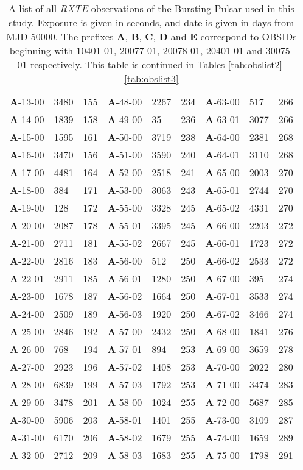 \begin{table*}
\begin{tabular}{lllllllll}
\textbf{A}-13-00&3480&155&\textbf{A}-48-00&2267&234&\textbf{A}-63-00&517&266\\
\textbf{A}-14-00&1839&158&\textbf{A}-49-00&35&236&\textbf{A}-63-01&3077&266\\
\textbf{A}-15-00&1595&161&\textbf{A}-50-00&3719&238&\textbf{A}-64-00&2381&268\\
\textbf{A}-16-00&3470&156&\textbf{A}-51-00&3590&240&\textbf{A}-64-01&3110&268\\
\textbf{A}-17-00&4481&164&\textbf{A}-52-00&2518&241&\textbf{A}-65-00&2003&270\\
\textbf{A}-18-00&384&171&\textbf{A}-53-00&3063&243&\textbf{A}-65-01&2744&270\\
\textbf{A}-19-00&128&172&\textbf{A}-55-00&3328&245&\textbf{A}-65-02&4331&270\\
\textbf{A}-20-00&2087&178&\textbf{A}-55-01&3395&245&\textbf{A}-66-00&2203&272\\
\textbf{A}-21-00&2711&181&\textbf{A}-55-02&2667&245&\textbf{A}-66-01&1723&272\\
\textbf{A}-22-00&2816&183&\textbf{A}-56-00&512&250&\textbf{A}-66-02&2533&272\\
\textbf{A}-22-01&2911&185&\textbf{A}-56-01&1280&250&\textbf{A}-67-00&395&274\\
\textbf{A}-23-00&1678&187&\textbf{A}-56-02&1664&250&\textbf{A}-67-01&3533&274\\
\textbf{A}-24-00&2509&189&\textbf{A}-56-03&1920&250&\textbf{A}-67-02&3466&274\\
\textbf{A}-25-00&2846&192&\textbf{A}-57-00&2432&250&\textbf{A}-68-00&1841&276\\
\textbf{A}-26-00&768&194&\textbf{A}-57-01&894&253&\textbf{A}-69-00&3659&278\\
\textbf{A}-27-00&2923&196&\textbf{A}-57-02&1408&253&\textbf{A}-70-00&2022&280\\
\textbf{A}-28-00&6839&199&\textbf{A}-57-03&1792&253&\textbf{A}-71-00&3474&283\\
\textbf{A}-29-00&3478&201&\textbf{A}-58-00&1024&255&\textbf{A}-72-00&5687&285\\
\textbf{A}-30-00&5906&203&\textbf{A}-58-01&1401&255&\textbf{A}-73-00&3109&287\\
\textbf{A}-31-00&6170&206&\textbf{A}-58-02&1679&255&\textbf{A}-74-00&1659&289\\
\textbf{A}-32-00&2712&209&\textbf{A}-58-03&1683&255&\textbf{A}-75-00&1798&291\\
\hline
\hline
\end{tabular}
\caption[A list of all \textit{RXTE} observations of the Bursting Pulsar used in this thesis.]{A list of all \indexrxte\textit{RXTE} observations of the Bursting Pulsar used in this study.  Exposure is given in seconds, and date is given in days from MJD 50000.  The prefixes \textbf{A}, \textbf{B}, \textbf{C}, \textbf{D} and \textbf{E} correspond to OBSIDs beginning with 10401-01, 20077-01, 20078-01, 20401-01 and 30075-01 respectively.  This table is continued in Tables \ref{tab:obslist2}-\ref{tab:obslist3}}
\label{tab:obslist}
\end{table*}

